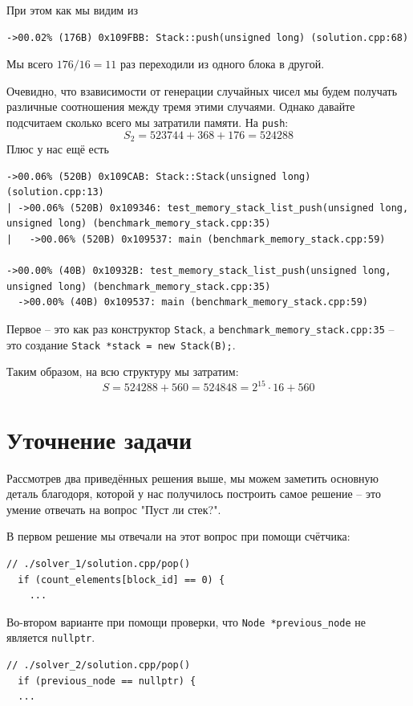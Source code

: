 При этом как мы видим из 
\begin{lstlisting}[caption={}, label={}, style=style_code_block]
->00.02% (176B) 0x109FBB: Stack::push(unsigned long) (solution.cpp:68)
\end{lstlisting}
Мы всего \(176/16 = 11\) раз переходили из одного блока в другой. 

Очевидно, что взависимости от генерации случайных чисел мы будем получать различные соотношения между тремя этими случаями. Однако давайте подсчитаем сколько всего мы затратили памяти. На \texttt{push}:
\begin{dmath*}
  S_2 = 523744 + 368 + 176 = 524288
\end{dmath*}
Плюс у нас ещё есть
\begin{lstlisting}[caption={}, label={}, style=style_code_block]
->00.06% (520B) 0x109CAB: Stack::Stack(unsigned long) (solution.cpp:13)
| ->00.06% (520B) 0x109346: test_memory_stack_list_push(unsigned long, unsigned long) (benchmark_memory_stack.cpp:35)
|   ->00.06% (520B) 0x109537: main (benchmark_memory_stack.cpp:59)

->00.00% (40B) 0x10932B: test_memory_stack_list_push(unsigned long, unsigned long) (benchmark_memory_stack.cpp:35)
  ->00.00% (40B) 0x109537: main (benchmark_memory_stack.cpp:59)
\end{lstlisting}
Первое -- это как раз конструктор \texttt{Stack}, а \texttt{benchmark_memory_stack.cpp:35} -- это создание \texttt{Stack *stack = new Stack(B);}. 

Таким образом, на всю структуру мы затратим:
\begin{dmath*}
  S = 524288 + 560 = 524848 = 2^{15} \cdot 16 + 560
\end{dmath*}


\section{Уточнение задачи}
Рассмотрев два приведённых решения выше, мы можем заметить основную деталь благодоря, которой у нас получилось построить самое решение -- это умение отвечать на вопрос "Пуст ли стек?". 

В первом решение мы отвечали на этот вопрос при помощи счётчика:
\begin{verbatim}
// ./solver_1/solution.cpp/pop()
  if (count_elements[block_id] == 0) {
    ...
\end{verbatim}
Во-втором варианте при помощи проверки, что \texttt{Node *previous_node} не является \texttt{nullptr}.
\begin{verbatim}
// ./solver_2/solution.cpp/pop()
  if (previous_node == nullptr) { 
  ...
\end{verbatim}

